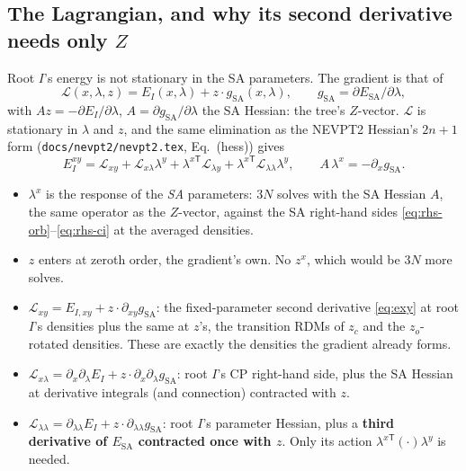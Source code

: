 \documentclass[11pt]{article}
\newcommand{\code}[1]{\texttt{#1}}
\newcommand{\Lag}{\mathcal L}
\newcommand{\Exy}{E^{xy}}
\begin{document}
\subsection{The Lagrangian, and why its second derivative needs only \texorpdfstring{$Z$}{Z}}
\label{sec:sa-lagrangian}

Root $I$'s energy is not stationary in the SA parameters. The gradient is
that of
\begin{equation}
  \Lag(x, \lambda, z) = E_I(x, \lambda) + z\cdot g_{\mathrm{SA}}(x, \lambda),
  \qquad g_{\mathrm{SA}} = \partial E_{\mathrm{SA}}/\partial\lambda,
\end{equation}
with $A z = -\partial E_I/\partial\lambda$, $A =
\partial g_{\mathrm{SA}}/\partial\lambda$ the SA Hessian: the tree's
$Z$-vector. $\Lag$ is stationary in $\lambda$ and $z$, and the same
elimination as the NEVPT2 Hessian's $2n+1$ form
(\code{docs/nevpt2/nevpt2.tex}, Eq.~(hess)) gives
\begin{equation}
\boxed{\;
  \Exy_I = \Lag_{xy} + \Lag_{x\lambda}\lambda^y + \lambda^{x\mathsf T}\Lag_{\lambda y}
     + \lambda^{x\mathsf T}\Lag_{\lambda\lambda}\lambda^y,
  \qquad A\,\lambda^x = -\partial_x g_{\mathrm{SA}}.\;}
  \label{eq:sa}
\end{equation}
\begin{itemize}
  \item $\lambda^x$ is the response of the \emph{SA} parameters: $3N$
        solves with the SA Hessian $A$, the same operator as the
        $Z$-vector, against the SA right-hand sides
        \eqref{eq:rhs-orb}--\eqref{eq:rhs-ci} at the averaged densities.
  \item $z$ enters at zeroth order, the gradient's own. No $z^x$, which
        would be $3N$ more solves.
  \item $\Lag_{xy} = E_{I,xy} + z\cdot\partial_{xy}g_{\mathrm{SA}}$: the
        fixed-parameter second derivative \eqref{eq:exy} at root $I$'s
        densities plus the same at $z$'s, the transition RDMs of $z_c$
        and the $z_o$-rotated densities. These are exactly the densities
        the gradient already forms.
  \item $\Lag_{x\lambda} = \partial_x\partial_\lambda E_I
        + z\cdot\partial_x\partial_\lambda g_{\mathrm{SA}}$: root $I$'s
        CP right-hand side, plus the SA Hessian at derivative integrals
        (and connection) contracted with $z$.
  \item $\Lag_{\lambda\lambda} = \partial_{\lambda\lambda}E_I
        + z\cdot\partial_{\lambda\lambda}g_{\mathrm{SA}}$: root $I$'s
        parameter Hessian, plus a \textbf{third derivative of
        $E_{\mathrm{SA}}$ contracted once with $z$}. Only its action
        $\lambda^{x\mathsf T}(\cdot)\lambda^y$ is needed.
\end{itemize}
\end{document}
